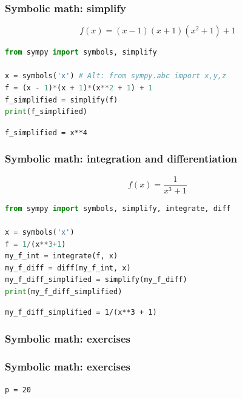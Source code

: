 
\begin{frame}[fragile]
  \frametitle{Symbolic math: simplify}
  \[ f(x) = (x - 1) (x + 1) (x^2 + 1) + 1 \]
  \pause
  \begin{lstlisting}[language=Python]
from sympy import symbols, simplify

x = symbols('x') # Alt: from sympy.abc import x,y,z
f = (x - 1)*(x + 1)*(x**2 + 1) + 1
f_simplified = simplify(f)
print(f_simplified)
  \end{lstlisting}
  \pause
  \texttt{f\_simplified = x**4}
\end{frame}

\begin{frame}[fragile]
  \frametitle{Symbolic math: integration and differentiation}
  \[ f(x) = \frac{1}{x^3+1} \]
  \pause
  \begin{lstlisting}[language=Python]
from sympy import symbols, simplify, integrate, diff

x = symbols('x')
f = 1/(x**3+1)
my_f_int = integrate(f, x)
my_f_diff = diff(my_f_int, x)
my_f_diff_simplified = simplify(my_f_diff)
print(my_f_diff_simplified)
\end{lstlisting}
  \pause
  \texttt{my\_f\_diff\_simplified = 1/(x**3 + 1)}
\end{frame}

\begin{frame}[fragile]
  \frametitle{Symbolic math: exercises}
\end{frame}

\begin{frame}[fragile]
  \frametitle{Symbolic math: exercises}
  \pause
  \texttt{p = 20}
\end{frame}


